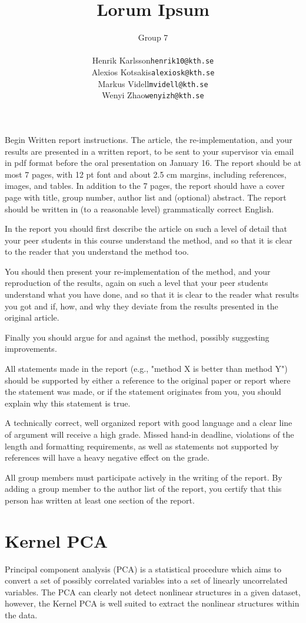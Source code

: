\documentclass[12pt]{article}
\title{
	Lorum Ipsum
}
\author{
	Group 7\\
	\begin{tabular}{r l}
		Henrik Karlsson &\texttt{henrik10@kth.se} \\
		Alexios Kotsakis &\texttt{alexiosk@kth.se}\\
		Markus Videll &\texttt{mvidell@kth.se}\\
		Wenyi Zhao &\texttt{wenyizh@kth.se}
	\end{tabular}
}
\begin{document}
\maketitle

Begin Written report instructions.  The article, the re-implementation, and
your results are presented in a written report, to be sent to your
supervisor via email in pdf format before the oral presentation on January
16. The report should be at most 7 pages, with 12 pt font and about 2.5 cm
margins, including references, images, and tables. In addition to the 7
pages, the report should have a cover page with title, group number, author
list and (optional) abstract. The report should be written in (to a
reasonable level) grammatically correct English.

In the report you should first describe the article on such a level of
detail that your peer students in this course understand the method, and so
that it is clear to the reader that you understand the method too.

You should then present your re-implementation of the method, and your
reproduction of the results, again on such a level that your peer students
understand what you have done, and so that it is clear to the reader what
results you got and if, how, and why they deviate from the results presented
in the original article.

Finally you should argue for and against the method, possibly suggesting
improvements.

All statements made in the report (e.g., "method X is better than method Y")
should be supported by either a reference to the original paper or report
where the statement was made, or if the statement originates from you, you
should explain why this statement is true.

A technically correct, well organized report with good language and a clear
line of argument will receive a high grade. Missed hand-in deadline,
violations of the length and formatting requirements, as well as statements
not supported by references will have a heavy negative effect on the grade.

All group members must participate actively in the writing of the report. By
adding a group member to the author list of the report, you certify that
this person has written at least one section of the report.

\newpage

\section{Kernel PCA}
Principal component analysis (PCA) is a statistical procedure which aims to
convert a set of possibly correlated variables into a set of linearly
uncorrelated variables. The PCA can clearly not detect nonlinear structures in
a given dataset, however, the Kernel PCA is well suited to extract the
nonlinear structures within the data.
\end{document}
